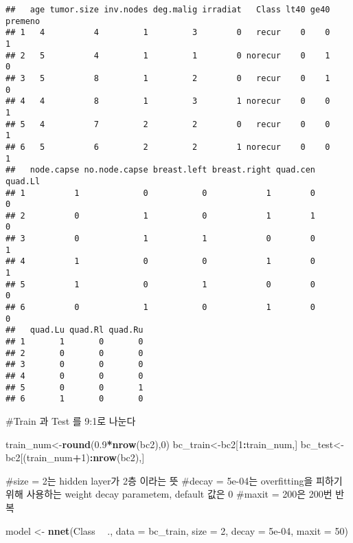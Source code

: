 \documentclass[]{article}
\newenvironment{Shaded}{\begin{snugshade}}{\end{snugshade}}
\newcommand{\DataTypeTok}[1]{\textcolor[rgb]{0.13,0.29,0.53}{#1}}
\newcommand{\DecValTok}[1]{\textcolor[rgb]{0.00,0.00,0.81}{#1}}
\newcommand{\FloatTok}[1]{\textcolor[rgb]{0.00,0.00,0.81}{#1}}
\newcommand{\KeywordTok}[1]{\textcolor[rgb]{0.13,0.29,0.53}{\textbf{#1}}}
\newcommand{\NormalTok}[1]{#1}
\newcommand{\OperatorTok}[1]{\textcolor[rgb]{0.81,0.36,0.00}{\textbf{#1}}}
\newcommand{\StringTok}[1]{\textcolor[rgb]{0.31,0.60,0.02}{#1}}
\begin{document}
\begin{verbatim}
##   age tumor.size inv.nodes deg.malig irradiat   Class lt40 ge40 premeno
## 1   4          4         1         3        0   recur    0    0       1
## 2   5          4         1         1        0 norecur    0    1       0
## 3   5          8         1         2        0   recur    0    1       0
## 4   4          8         1         3        1 norecur    0    0       1
## 5   4          7         2         2        0   recur    0    0       1
## 6   5          6         2         2        1 norecur    0    0       1
##   node.capse no.node.capse breast.left breast.right quad.cen quad.Ll
## 1          1             0           0            1        0       0
## 2          0             1           0            1        1       0
## 3          0             1           1            0        0       1
## 4          1             0           0            1        0       1
## 5          1             0           1            0        0       0
## 6          0             1           0            1        0       0
##   quad.Lu quad.Rl quad.Ru
## 1       1       0       0
## 2       0       0       0
## 3       0       0       0
## 4       0       0       0
## 5       0       0       1
## 6       1       0       0
\end{verbatim}

\#Train 과 Test 를 9:1로 나눈다

\begin{Shaded}
\begin{Highlighting}[]
\NormalTok{train_num<-}\KeywordTok{round}\NormalTok{(}\FloatTok{0.9}\OperatorTok{*}\KeywordTok{nrow}\NormalTok{(bc2),}\DecValTok{0}\NormalTok{)}
\NormalTok{bc_train<-bc2[}\DecValTok{1}\OperatorTok{:}\NormalTok{train_num,]}
\NormalTok{bc_test<-bc2[(train_num}\OperatorTok{+}\DecValTok{1}\NormalTok{)}\OperatorTok{:}\KeywordTok{nrow}\NormalTok{(bc2),]}
\end{Highlighting}
\end{Shaded}

\#size = 2는 hidden layer가 2층 이라는 뜻 \#decay = 5e-04는
overfitting을 피하기 위해 사용하는 weight decay parametem, default 값은
0 \#maxit = 200은 200번 반복

\begin{Shaded}
\begin{Highlighting}[]
\NormalTok{model <-}\StringTok{ }\KeywordTok{nnet}\NormalTok{(Class }\OperatorTok{~}\StringTok{ }\NormalTok{., }\DataTypeTok{data =}\NormalTok{ bc_train, }\DataTypeTok{size =} \DecValTok{2}\NormalTok{, }\DataTypeTok{decay =} \FloatTok{5e-04}\NormalTok{, }\DataTypeTok{maxit =} \DecValTok{50}\NormalTok{)}
\end{Highlighting}
\end{Shaded}
\end{document}
